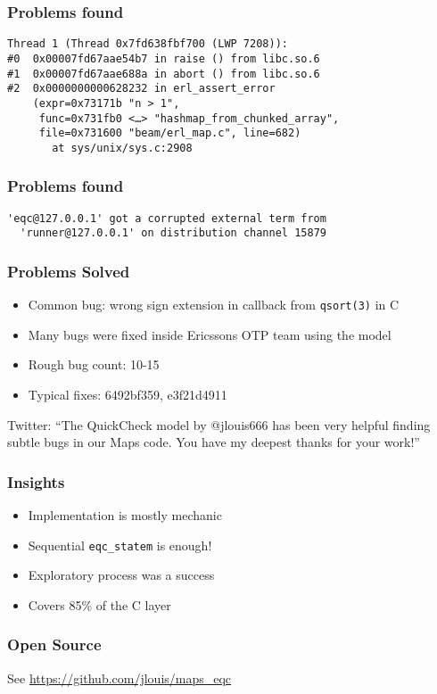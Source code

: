 \documentclass[lualatex]{beamer}
\begin{document}
\begin{frame}[fragile]
\frametitle{Problems found}

\begin{verbatim}
Thread 1 (Thread 0x7fd638fbf700 (LWP 7208)):
#0  0x00007fd67aae54b7 in raise () from libc.so.6
#1  0x00007fd67aae688a in abort () from libc.so.6
#2  0x0000000000628232 in erl_assert_error
    (expr=0x73171b "n > 1", 
     func=0x731fb0 <…> "hashmap_from_chunked_array", 
     file=0x731600 "beam/erl_map.c", line=682)
       at sys/unix/sys.c:2908
\end{verbatim}
\end{frame}

\begin{frame}[fragile]
\frametitle{Problems found}

\begin{verbatim}
'eqc@127.0.0.1' got a corrupted external term from
  'runner@127.0.0.1' on distribution channel 15879
\end{verbatim}

\end{frame}

\begin{frame}[fragile]
\frametitle{Problems Solved}

\begin{itemize}
\item Common bug: wrong sign extension in callback from \texttt{qsort(3)} in C
\item Many bugs were fixed inside Ericssons OTP team using the model
\item Rough bug count: 10-15
\item Typical fixes: 6492bf359, e3f21d4911
\end{itemize}

Twitter: ``The QuickCheck model by @jlouis666 has been very helpful finding subtle bugs in our Maps code. You have my deepest thanks for your work!''

\end{frame}


\begin{frame}
\frametitle{Insights}

\begin{itemize}
\item Implementation is mostly mechanic
\item Sequential \texttt{eqc\_statem} is enough!
\item Exploratory process was a success
\item Covers 85\% of the C layer
\end{itemize}

\end{frame}

\begin{frame}
\frametitle{Open Source}

See \url{https://github.com/jlouis/maps_eqc}

\end{frame}
\end{document}
